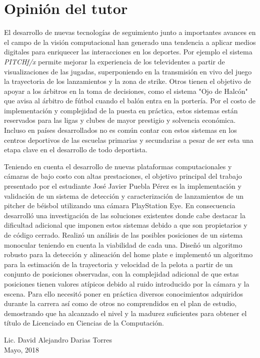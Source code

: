 \chapter*{Opinión del tutor}\label{chapter:supervisorOpinion}

El desarrollo de nuevas tecnologías de seguimiento junto a importantes avances en el campo de la visión computacional han generado una tendencia a aplicar medios digitales para enriquecer las interacciones en los deportes. Por ejemplo el sistema \textit{PITCHf/x} permite mejorar la experiencia de los televidentes a partir de visualizaciones de las jugadas, superponiendo en la transmisión en vivo del juego la trayectoria de los lanzamientos y la zona de strike. Otros tienen el objetivo de apoyar a los árbitros en la toma de decisiones, como el sistema "Ojo de Halcón" que avisa al árbitro de fútbol cuando el balón entra en la portería. Por el costo de implementación y complejidad de la puesta en práctica, estos sistemas están reservados para las ligas y clubes de mayor prestigio y solvencia económica. Incluso en países desarrollados no es común contar con estos sistemas en los centros deportivos de las escuelas primarias y secundarias a pesar de ser esta una etapa clave en el desarrollo de todo deportista.

Teniendo en cuenta el desarrollo de nuevas plataformas computacionales y cámaras de bajo costo con altas prestaciones, el objetivo principal del trabajo presentado por el estudiante José Javier Puebla Pérez es la implementación y validación de un sistema de detección y caracterización de lanzamientos de un pitcher de béisbol utilizando una cámara PlayStation Eye. En consecuencia desarrolló una investigación de las soluciones existentes donde cabe destacar la dificultad adicional que imponen estos sistemas debido a que son propietarios y de código cerrado. Realizó un análisis de las posibles posiciones de un sistema monocular teniendo en cuenta la viabilidad de cada una. Diseñó un algoritmo robusto para la detección y alineación del home plate e implementó un algoritmo para la estimación de la trayectoria y velocidad de la pelota a partir de un conjunto de posiciones observadas, con la complejidad adicional de que estas posiciones tienen valores atípicos debido al ruido introducido por la cámara y la escena. Para ello necesitó poner en práctica diversos conocimientos adquiridos durante la carrera así como de otros no comprendidos en el plan de estudio, demostrando que ha alcanzado el nivel y la madurez suficientes para obtener el título de Licenciado en Ciencias de la Computación.

\begin{flushright}
	Lic. David Alejandro Darias Torres\\
	Mayo, 2018
\end{flushright}
